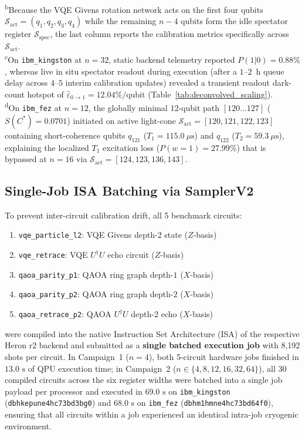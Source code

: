 \documentclass[aps,pra,reprint,superscriptaddress,floatfix,nofootinbib]{revtex4-2}
\begin{document}
\begin{table}[t]
{\textsuperscript{b}Because the VQE Givens rotation network acts on the first four qubits $\mathcal{S}_{\text{act}} = (q_1, q_2, q_3, q_4)$ while the remaining $n - 4$ qubits form the idle spectator register $\mathcal{S}_{\text{spec}}$, the last column reports the calibration metrics specifically across $\mathcal{S}_{\text{act}}$.\\
\textsuperscript{c}On \texttt{ibm\_kingston} at $n = 32$, static backend telemetry reported $P(1|0) = 0.88\%$, whereas live in situ spectator readout during execution (after a $1$--$2$~h queue delay across $4$--$5$ interim calibration updates) revealed a transient readout dark-count hotspot of $\hat{\varepsilon}_{0\to 1} = 12.04\%/\text{qubit}$ (Table~\ref{tab:deconvolved_scaling}).\\
\textsuperscript{d}On \texttt{ibm\_fez} at $n = 12$, the globally minimal 12-qubit path $[120 \dots 127]$ ($S(C^*) = 0.0701$) initiated on active light-cone $\mathcal{S}_{\text{act}} = [120, 121, 122, 123]$ containing short-coherence qubits $q_{121}$ ($T_1 = 115.0\ \mu\text{s}$) and $q_{122}$ ($T_2 = 59.3\ \mu\text{s}$), explaining the localized $T_1$ excitation loss ($P(w=1) = 27.99\%$) that is bypassed at $n = 16$ via $\mathcal{S}_{\text{act}} = [124, 123, 136, 143]$.\par}
\end{table}

\subsection{Single-Job ISA Batching via SamplerV2}
To prevent inter-circuit calibration drift, all 5 benchmark circuits:
\begin{enumerate}
    \item \texttt{vqe\_particle\_l2}: VQE Givens depth-2 state ($Z$-basis)
    \item \texttt{vqe\_retrace}: VQE $U^\dagger U$ echo circuit ($Z$-basis)
    \item \texttt{qaoa\_parity\_p1}: QAOA ring graph depth-$1$ ($X$-basis)
    \item \texttt{qaoa\_parity\_p2}: QAOA ring graph depth-$2$ ($X$-basis)
    \item \texttt{qaoa\_retrace\_p2}: QAOA $U^\dagger U$ depth-$2$ echo ($X$-basis)
\end{enumerate}
were compiled into the native Instruction Set Architecture (ISA) of the respective Heron r2 backend and submitted as a \textbf{single batched execution job} with 8,192 shots per circuit. In Campaign~1 ($n = 4$), both 5-circuit hardware jobs finished in $13.0\text{ s}$ of QPU execution time; in Campaign~2 ($n \in \{4, 8, 12, 16, 32, 64\}$), all 30 compiled circuits across the six register widths were batched into a single job payload per processor and executed in $69.0\text{ s}$ on \texttt{ibm\_kingston} (\texttt{dbhkepune4hc73bd3bg0}) and $68.0\text{ s}$ on \texttt{ibm\_fez} (\texttt{dbhm1hmne4hc73bd64f0}), ensuring that all circuits within a job experienced an identical intra-job cryogenic environment.
\end{document}

